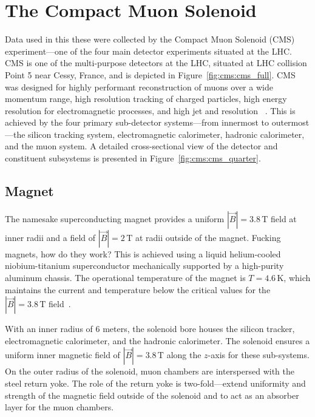 \section{The Compact Muon Solenoid}\label{ch:cms:CMS}
 Data used in this these were collected by the Compact Muon Solenoid (CMS) experiment---one of the four main detector experiments situated at the LHC. CMS is one of the multi-purpose detectors at the LHC, situated at LHC collision Point 5 near Cessy, France, and is depicted in Figure~\ref{fig:cms:cms_full}. CMS was designed for highly performant reconstruction of muons over a wide momentum range, high resolution tracking of charged particles, high energy resolution for electromagnetic processes, and high jet and \met resolution ~\cite{Ball:2007zza,Bayatian:2006nff}. This is achieved by the four primary sub-detector systems---from innermost to outermost---the silicon tracking system, electromagnetic calorimeter, hadronic calorimeter, and the muon system. A detailed cross-sectional view of the detector and constituent subsystems is presented in Figure~\ref{fig:cms:cms_quarter}.


\subsection{Magnet}\label{ch:cms:magnet}
The namesake superconducting magnet provides a uniform $|\vec{B}| = 3.8 \,\mathrm{T}$ field at inner radii and a field of $|\vec{B}| = 2 \,\mathrm{T}$ at radii outside of the magnet. Fucking magnets, how do they work? This is achieved using a liquid helium-cooled niobium-titanium superconductor mechanically supported by a high-purity aluminum chassis. The operational temperature of the magnet is $T = 4.6 \,\mathrm{K}$, which maintains the current and temperature below the critical values for the $|\vec{B}| = 3.8 \,\mathrm{T}$ field~\cite{Acquistapace:1997fm}.

With an inner radius of 6 meters, the solenoid bore houses the silicon tracker, electromagnetic calorimeter, and the hadronic calorimeter. The solenoid ensures a uniform inner magnetic field of $|\vec{B}| = 3.8 \,\mathrm{T}$ along the $z$-axis for these sub-systems. On the outer radius of the solenoid, muon chambers are interspersed with the steel return yoke. The role of the return yoke is two-fold---extend uniformity and strength of the magnetic field outside of the solenoid and to act as an absorber layer for the muon chambers. 

